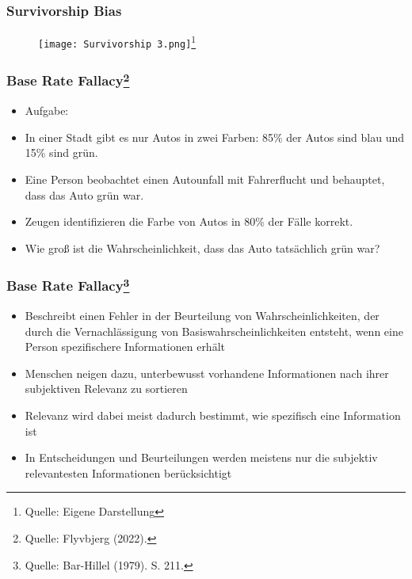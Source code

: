 \documentclass{beamer}
\begin{document}
\begin{frame}
\frametitle{Survivorship Bias}

\begin{figure}
    \centering
    \texttt{[image: Survivorship 3.png]}\footnote{Quelle: {Eigene Darstellung}}
    
\end{figure}

\end{frame}

\begin{frame}
\frametitle{Base Rate Fallacy\footnote{Quelle: {Flyvbjerg (2022).}}}
\begin{itemize}
    \item Aufgabe:
    \item In einer Stadt gibt es nur Autos in zwei Farben: 85\% der Autos sind blau und 15\% sind grün.
    \item Eine Person beobachtet einen Autounfall mit Fahrerflucht und behauptet, dass das Auto grün war.
    \item Zeugen identifizieren die Farbe von Autos in 80\% der Fälle korrekt.
    \item Wie groß ist die Wahrscheinlichkeit, dass das Auto tatsächlich grün war?
\end{itemize}
\end{frame}

\begin{frame}
\frametitle{Base Rate Fallacy\footnote{Quelle: {Bar-Hillel (1979). S. 211.}}}
\begin{itemize}
    \item Beschreibt einen Fehler in der Beurteilung von Wahrscheinlichkeiten, der durch die Vernachlässigung von Basiswahrscheinlichkeiten entsteht, wenn eine Person spezifischere Informationen erhält
    \item Menschen neigen dazu, unterbewusst vorhandene Informationen nach ihrer subjektiven Relevanz zu sortieren
    \item Relevanz wird dabei meist dadurch bestimmt, wie spezifisch eine Information ist
    \item In Entscheidungen und Beurteilungen werden meistens nur die subjektiv relevantesten Informationen berücksichtigt
\end{itemize}
\end{frame}
\end{document}
